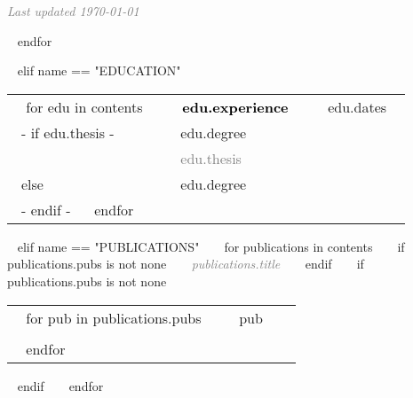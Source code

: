 \begin{minipage}{\textwidth}
    \begin{center} \footnotesize \emph{\textcolor{gray}{Last updated \today }} \end{center}
    \vspace{0.7cm}

  ~{ endfor }~



~{ elif name == "EDUCATION" }~

  \begin{tabular}{ p{} 
                   p{} 
                   p{}}
  ~{ for edu in contents }~
  \small\textcolor{gray}{{\emph{  }}} & \textbf{\textcolor{black}{~{{ edu.experience }}~}} & {\hfill \small{~{{ edu.dates }}~}}\\
  ~{- if edu.thesis -}~ 
  \small & {~{{ edu.degree }}~} & {\hfill} \\
   & \small{\textcolor{gray}{~{{ edu.thesis }}~}} & {\hfill} \newline \\
  ~{else}~
   \small & {~{{ edu.degree }}~} & {\hfill} \newline\\
  ~{- endif -}~
  ~{ endfor }~
\end{tabular}


%

~{ elif name == "PUBLICATIONS" }~
~{ for publications in contents }~
  ~{ if publications.pubs is not none }~ 
  \textcolor{gray}{{\emph{~{{ publications.title }}~}}} 
  ~{ endif }~
  ~{ if publications.pubs is not none }~ 
    \begin{tabular}{ p{} %
                     p{} 
                     p{}} %
    ~{ for pub in publications.pubs }~
      \small\textcolor{gray}{{\emph{  }}} & {~{{ pub }}~} & {\hfill \small{ }} \\ \\
    ~{ endfor }~ 
    \end{tabular}
  ~{ endif }~
~{ endfor }~


\end{minipage}
